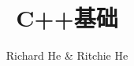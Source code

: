 \documentclass[12pt,twiside,a4paper]{ctexbook}
\numberwithin{chapter}{part}
\begin{document}

\author
{
Richard He \& Ritchie He
}


\title{C++基础}
\maketitle
\tableofcontents %
\newpage
\pagestyle{fancy}
\end{document}
